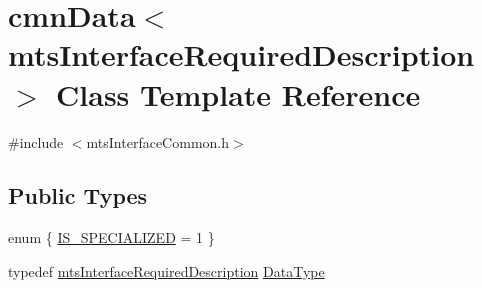 \hypertarget{classcmn_data_3_01mts_interface_required_description_01_4}{}\section{cmn\+Data$<$ mts\+Interface\+Required\+Description $>$ Class Template Reference}
\label{classcmn_data_3_01mts_interface_required_description_01_4}


{\ttfamily \#include $<$mts\+Interface\+Common.\+h$>$}

\subsection*{Public Types}
\begin{DoxyCompactItemize}
\item 
enum \{ \hyperlink{classcmn_data_3_01mts_interface_required_description_01_4_a0638ce17f4d83fcbdfbcd0e6dbfdda92a0e707344edbfbf19223d257659576c0e}{I\+S\+\_\+\+S\+P\+E\+C\+I\+A\+L\+I\+Z\+E\+D} = 1
 \}
\item 
typedef \hyperlink{classmts_interface_required_description}{mts\+Interface\+Required\+Description} \hyperlink{classcmn_data_3_01mts_interface_required_description_01_4_aa335fadfd965b6b92ab7fa93b18c547d}{Data\+Type}
\end{DoxyCompactItemize}
